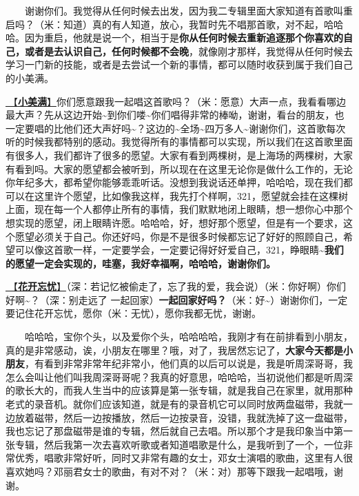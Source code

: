 \documentclass[]{ctexbook}
\begin{document}
  谢谢你们。我觉得从任何时候去出发，因为我二专辑里面大家知道有首歌叫重启吗？（米：知道）真的有人知道，放心，我暂时先不唱那首歌，对不起，哈哈哈。因为重启，他就是说一个，相当于是\textbf{你从任何时候去重新追逐那个你喜欢的自己，或者是去认识自己，任何时候都不会晚}，就像刚才那样，我觉得从任何时候去学习一门新的技能，或者是去尝试一个新的事情，都可以随时收获到属于我们自己的小美满。

\hyperref[happy-ending]{🎵【\textbf{小美满}】}你们愿意跟我一起唱这首歌吗？（米：愿意）大声一点，我看看哪边最大声？先从这边开始\textasciitilde 到你们喽\textasciitilde 你们唱得非常的棒呦，谢谢，看台的朋友，也一定要唱的比他们还大声好吗\textasciitilde？这边的\textasciitilde 全场\textasciitilde 四万多人\textasciitilde 谢谢你们，这首歌每次听的时候我都特别的感动。我觉得所有的事情都可以实现，所以我们在这首歌里面有很多人，我们都许了很多的愿望。大家有看到两棵树，是上海场的两棵树，大家有看到吗。大家的愿望都会被听到，所以现在在这里无论你是做什么工作的，无论你年纪多大，都希望你能够乖乖听话。没想到我说话还单押，哈哈哈，现在我们都可以在这里许个愿望，比如像我这样，我先打个样啊，321，愿望就会挂在这棵树上面，现在每一个人都停止所有的事情，我们默默地闭上眼睛，想一想你心中那个想实现的愿望，闭上眼睛许愿。哈哈哈，好，想好那个愿望，但是有一个要求，这个愿望必须关于自己。你还好吗，你是不是很多时候都忘记了好好的照顾自己，希望可以像这首歌一样，一定要学会，一定要记得好好爱自己，321，睁眼睛\textasciitilde{}\textbf{我们的愿望一定会实现的，哇塞，我好幸福啊，哈哈哈，谢谢你们。}

\hyperref[no-worries]{🎵【\textbf{花开忘忧}】}（深：若记忆被偷走了，忘了我的爱，我会说）（米：你好啊）你们好啊\textasciitilde？（深：别走远了 一起回家）\textbf{一起回家好吗？}（米：好\textasciitilde）谢谢你们，一定要记住花开忘忧，愿你（米：无忧），愿你我都无忧，谢谢。

  哈哈哈，宝你个头，以及爱你个头，哈哈哈哈，我刚才有在前排看到小朋友，真的是非常感动，诶，小朋友在哪里？哦，对了，我居然忘记了，\textbf{大家今天都是小朋友}，有看到非常非常年纪非常小，他们真的以后可以说是，我是听周深哥哥，我怎么会叫让他们叫我周深哥哥呢？我真的好意思，哈哈哈，当初说他们都是听周深的歌长大的，而我人生当中的应该算是第一张专辑，就是我自己在家里，就用那种老式的录音机。就你们应该知道，就是有的录音机它可以同时放两盘磁带，我就一边放着磁带，然后一边按播放，然后一边按录音，没错，我就洗掉了这一盘磁带，我也忘记了那盘磁带是谁的专辑，然后就自己去唱。所以那个才是我印象当中第一张专辑，然后我第一次去喜欢听歌或者知道唱歌是什么，是我听到了一个，一位非常优秀，唱歌非常好听，同时又非常有趣的女士，邓女士演唱的歌曲，这里有人很喜欢她吗？邓丽君女士的歌曲，有对不对？（米：对）那等下跟我一起唱哦，谢谢。
\end{document}
